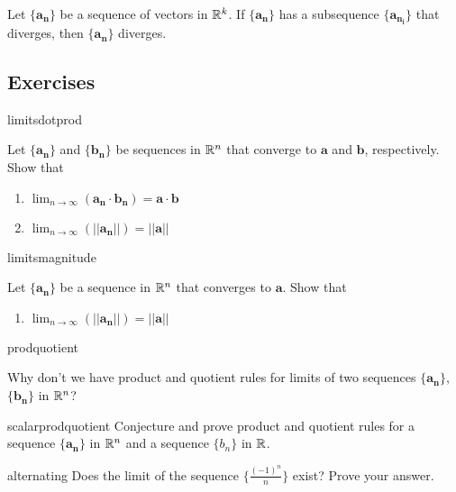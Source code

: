 \begin{theorem}\label{divergencecriteria}
Let $\{\bm{a_n}\}$ be a sequence of vectors in $\mathbb{R}^k$.  If $\{\bm{a_n}\}$ has a subsequence $\{\bm{a_{n_i}}\}$ that diverges, then $\{\bm{a_n}\}$ diverges.

\end{theorem}

\subsection{Exercises}
\begin{problem}{limitsdotprod}

Let $\{\bm{a_n}\}$ and $\{\bm{b_n}\}$ be sequences in $\mathbb{R}^n$ that converge to $\bm{a}$ and $\bm{b}$, respectively.  Show that
      \begin{enumerate}
          \item $\lim_{n \to \infty}( \bm{a_n} \cdot \bm{b_n} ) = \bm{a} \cdot \bm{b}$
          \item $\lim_{n \to \infty}(||\bm{a_n}||) = || \bm{a}||$
      \end{enumerate}
\end{problem}

\begin{problem}{limitsmagnitude}

Let $\{\bm{a_n}\}$ be a sequence in $\mathbb{R}^n$ that converges to $\bm{a}$.  Show that
      \begin{enumerate}
          \item $\lim_{n \to \infty}(||\bm{a_n}||) = || \bm{a}||$
      \end{enumerate}

\end{problem}

\begin{problem}{prodquotient}

Why don't we have product and quotient rules for limits of two sequences $\{\bm{a_n}\}$, $\{\bm{b_n}\}$ in $\mathbb{R}^n$?

\end{problem}

\begin{problem}{scalarprodquotient}
Conjecture and prove product and quotient rules for a sequence $\{\bm{a_n}\}$ in $\mathbb{R}^n$ and a sequence $\{b_n\}$ in $\mathbb{R}$.
\end{problem}

\begin{problem}{alternating}
Does the limit of the sequence $\{\frac{(-1)^n}{n}\}$ exist?  Prove your answer.
\end{problem}

